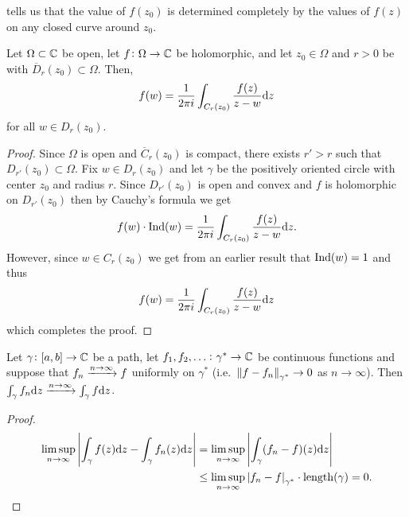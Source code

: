 \documentclass[11pt,a4paper]{article}
\begin{document}
\begin{remark}
  \label{rmk:cauchy-formula}
   tells us that the value of $f(z_0)$
  is determined completely
  by the values of $f(z)$ on any closed curve around $z_0$.
\end{remark}

\begin{corollary}
  \label{cor:f-described-with-integral}
  Let $\Omega \subset \mathbb{C}$ be open,
  let $f \colon \Omega \to \mathbb{C}$ be holomorphic,
  and let $z_0 \in \Omega$ and $r > 0$ be with
  $\overline D_r(z_0) \subset \Omega$.
  Then,
  \[
    f(w) = \frac{1}{2 \pi i} \int_{C_r(z_0)} \frac{f(z)}{z - w} \mathrm{d} z
  \]
  for all $w \in D_r(z_0)$.
\end{corollary}
\begin{proof}
  Since $\Omega$ is open and $\overline C_r(z_0)$ is compact,
  there exists $r' > r$ such that $D_{r'}(z_0) \subset \Omega$.
  Fix $w \in D_r(z_0)$ and let $\gamma$ be the positively oriented circle
  with center $z_0$ and radius $r$.
  Since $D_{r'}(z_0)$ is open and convex and $f$ is holomorphic on
  $D_{r'}(z_0)$ then by Cauchy's formula we get
  \[
    f(w) \cdot \operatorname{Ind}(w) =
    \frac{1}{2 \pi i} \int_{C_r(z_0)} \frac{f(z)}{z - w} \mathrm{d} z.
  \]
  However, since $w \in C_r(z_0)$ we get from an earlier result
  that $\operatorname{Ind}(w) = 1$ and thus
  \[
    f(w) = \frac{1}{2 \pi i} \int_{C_r(z_0)} \frac{f(z)}{z - w} \mathrm{d} z
  \]
  which completes the proof.
\end{proof}

\begin{lemma}
  \label{lem:nderivative}
  Let $\gamma \colon [a,b] \to \mathbb{C}$ be a path,
  let $f_1,f_2,\dots \colon \gamma^* \to \mathbb{C}$ be continuous functions
  and suppose that $f_n \xrightarrow{n \to \infty} f$ uniformly on $\gamma^*$
  (i.e.\ $\left\lVert f - f_n\right\rVert_{\gamma^*} \to 0$ as $n \to \infty$).
  Then $\int_{\gamma} f_n \mathrm{d} z \xrightarrow{n \to \infty} \int_{\gamma} f \mathrm{d} z$.
\end{lemma}
\begin{proof}
  \begin{align*}
    \limsup_{n \to \infty}
    \left\lvert\int_{\gamma} f(z) \mathrm{d} z - \int_{\gamma} f_n(z) \mathrm{d} z\right\rvert &=
    \limsup_{n \to \infty} \left\lvert\int_{\gamma} (f_n - f)(z) \mathrm{d} z\right\rvert \\ &\le
    \limsup_{n \to \infty} \left\lvert f_n - f\right\rvert_{\gamma^*} \cdot \mathrm{length}(\gamma) = 0.
  \end{align*}
\end{proof}
\end{document}
